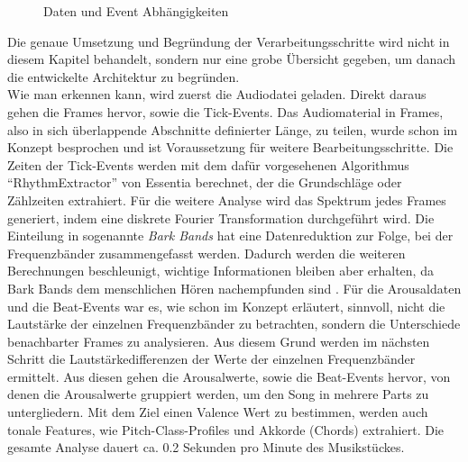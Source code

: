\documentclass[11pt,a4paper]{article}
\begin{document}
\begin{wrapfigure}{r}{0.5\linewidth}
\captionsetup{justification=centering}
\caption[Daten und Event Abhängigkeiten]{Daten und Event Abhängigkeiten}
\end{wrapfigure}
\noindent
Die genaue Umsetzung und Begründung der Verarbeitungsschritte wird nicht in diesem Kapitel behandelt, sondern nur eine grobe Übersicht gegeben, um danach die entwickelte Architektur zu begründen.\\
Wie man erkennen kann, wird zuerst die Audiodatei geladen. Direkt daraus gehen die Frames hervor, sowie die Tick-Events. Das Audiomaterial in Frames, also in sich überlappende Abschnitte definierter Länge, zu teilen, wurde schon im Konzept besprochen und ist Voraussetzung für weitere Bearbeitungsschritte. Die Zeiten der Tick-Events werden mit dem dafür vorgesehenen Algorithmus ``RhythmExtractor'' von Essentia berechnet, der die Grundschläge oder Zählzeiten extrahiert. Für die weitere Analyse wird das Spektrum jedes Frames generiert, indem eine diskrete Fourier Transformation durchgeführt wird. Die Einteilung in sogenannte \textit{Bark Bands} hat eine Datenreduktion zur Folge, bei der Frequenzbänder zusammengefasst werden. Dadurch werden die weiteren Berechnungen beschleunigt, wichtige Informationen bleiben aber erhalten, da Bark Bands dem menschlichen Hören nachempfunden sind \cite[S. 80]{lerch2012introduction}. Für die Arousaldaten und die Beat-Events war es, wie schon im Konzept erläutert, sinnvoll, nicht die Lautstärke der einzelnen Frequenzbänder zu betrachten, sondern die Unterschiede benachbarter Frames zu analysieren. Aus diesem Grund werden im nächsten Schritt die Lautstärkedifferenzen der Werte der einzelnen Frequenzbänder ermittelt. Aus diesen gehen die Arousalwerte, sowie die Beat-Events hervor, von denen die Arousalwerte gruppiert werden, um den Song in mehrere Parts zu untergliedern. Mit dem Ziel einen Valence Wert zu bestimmen, werden auch tonale Features, wie Pitch-Class-Profiles und Akkorde (Chords) extrahiert. Die gesamte Analyse dauert ca. 0.2 Sekunden pro Minute des Musikstückes.\\
\end{document}
